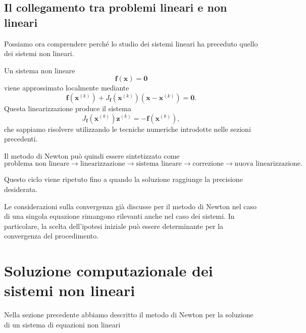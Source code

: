 \subsection{Il collegamento tra problemi lineari e non lineari}

Possiamo ora comprendere perché lo studio dei sistemi lineari ha
preceduto quello dei sistemi non lineari.

Un sistema non lineare
\begin{equation*}
    \mathbf{f}(\mathbf{x})=\mathbf{0}
\end{equation*}
viene approssimato localmente mediante
\begin{equation*}
    \mathbf{f}(\mathbf{x}^{(k)})
    +
    J_{\mathbf{f}}(\mathbf{x}^{(k)})
    \left(
        \mathbf{x}-\mathbf{x}^{(k)}
    \right)
    =
    \mathbf{0}.
\end{equation*}
Questa linearizzazione produce il sistema
\begin{equation*}
    J_{\mathbf{f}}(\mathbf{x}^{(k)})
    \mathbf{z}^{(k)}
    =
    -\mathbf{f}(\mathbf{x}^{(k)}),
\end{equation*}
che sappiamo risolvere utilizzando le tecniche numeriche introdotte
nelle sezioni precedenti.

Il metodo di Newton può quindi essere sintetizzato come
\small
\begin{equation*}
\boxed{
\text{problema non lineare}
\longrightarrow
\text{linearizzazione}
\longrightarrow
\text{sistema lineare}
\longrightarrow
\text{correzione}
\longrightarrow
\text{nuova linearizzazione}.
}
\end{equation*}

\normalsize

Questo ciclo viene ripetuto fino a quando la soluzione raggiunge
la precisione desiderata.

Le considerazioni sulla convergenza già discusse per il metodo di
Newton nel caso di una singola equazione rimangono rilevanti anche
nel caso dei sistemi. In particolare, la scelta dell'ipotesi iniziale
può essere determinante per la convergenza del procedimento.

\section{Soluzione computazionale dei sistemi non lineari}
\label{sec:soluzione-computazionale-nonlineari}

Nella sezione precedente abbiamo descritto il metodo di Newton per
la soluzione di un sistema di equazioni non lineari

